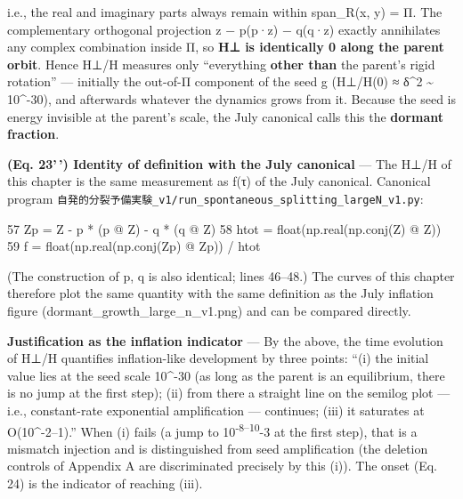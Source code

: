 \documentclass[
  a4paper,
]{ltjsarticle}
\newenvironment{Shaded}{}{}
\newcommand{\BuiltInTok}[1]{\textcolor[rgb]{0.00,0.50,0.00}{#1}}
\newcommand{\DecValTok}[1]{\textcolor[rgb]{0.25,0.63,0.44}{#1}}
\newcommand{\NormalTok}[1]{#1}
\newcommand{\OperatorTok}[1]{\textcolor[rgb]{0.40,0.40,0.40}{#1}}
\begin{document}
i.e., the real and imaginary parts always remain within span\_R(x, y) =
Π. The complementary orthogonal projection z − p(p·z) − q(q·z) exactly
annihilates any complex combination inside Π, so \textbf{H⊥ is
identically 0 along the parent orbit}. Hence H⊥/H measures only
``everything \textbf{other than} the parent's rigid rotation'' ---
initially the out-of-Π component of the seed g (H⊥/H(0) ≈ δ\^{}2
\textasciitilde{} 10\^{}-30), and afterwards whatever the dynamics grows
from it. Because the seed is energy invisible at the parent's scale, the
July canonical calls this the \textbf{dormant fraction}.

\textbf{(Eq. 23'\,') Identity of definition with the July canonical} ---
The H⊥/H of this chapter is the same measurement as f(τ) of the July
canonical. Canonical program
\texttt{自発的分裂予備実験\_v1/run\_spontaneous\_splitting\_largeN\_v1.py}:

\begin{Shaded}
\begin{Highlighting}[]
    \DecValTok{57}\NormalTok{          Zp }\OperatorTok{=}\NormalTok{ Z }\OperatorTok{{-}}\NormalTok{ p }\OperatorTok{*}\NormalTok{ (p }\OperatorTok{@}\NormalTok{ Z) }\OperatorTok{{-}}\NormalTok{ q }\OperatorTok{*}\NormalTok{ (q }\OperatorTok{@}\NormalTok{ Z)}
    \DecValTok{58}\NormalTok{          htot }\OperatorTok{=} \BuiltInTok{float}\NormalTok{(np.real(np.conj(Z) }\OperatorTok{@}\NormalTok{ Z))}
    \DecValTok{59}\NormalTok{          f }\OperatorTok{=} \BuiltInTok{float}\NormalTok{(np.real(np.conj(Zp) }\OperatorTok{@}\NormalTok{ Zp)) }\OperatorTok{/}\NormalTok{ htot}
\end{Highlighting}
\end{Shaded}

(The construction of p, q is also identical; lines 46--48.) The curves
of this chapter therefore plot the same quantity with the same
definition as the July inflation figure
(dormant\_growth\_large\_n\_v1.png) and can be compared directly.

\textbf{Justification as the inflation indicator} --- By the above, the
time evolution of H⊥/H quantifies inflation-like development by three
points: ``(i) the initial value lies at the seed scale 10\^{}-30 (as
long as the parent is an equilibrium, there is no jump at the first
step); (ii) from there a straight line on the semilog plot --- i.e.,
constant-rate exponential amplification --- continues; (iii) it
saturates at O(10\^{}-2--1).'' When (i) fails (a jump to
10\textsuperscript{-8--10}-3 at the first step), that is a mismatch
injection and is distinguished from seed amplification (the deletion
controls of Appendix A are discriminated precisely by this (i)). The
onset (Eq. 24) is the indicator of reaching (iii).
\end{document}
